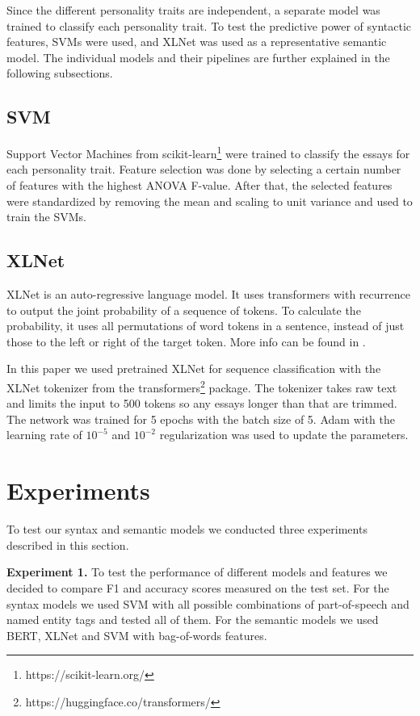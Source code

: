 \documentclass[10pt, a4paper]{article}
\begin{document}
Since the different personality traits are independent, a separate model was trained to classify each personality trait.
To test the predictive power of syntactic features, SVMs were used, and XLNet was used as a representative semantic model.
The individual models and their pipelines are further explained in the following subsections.

\subsection{SVM}

Support Vector Machines from scikit-learn\footnote{https://scikit-learn.org/} were trained to classify the essays for each personality trait.
Feature selection was done by selecting a certain number of features with the highest ANOVA F-value.
After that, the selected features were standardized by removing the mean and scaling to unit variance and used to train the SVMs.

\subsection{XLNet}

XLNet is an auto-regressive language model.
It uses transformers with recurrence to output the joint probability of a sequence of tokens.
To calculate the probability, it uses all permutations of word tokens in a sentence, instead of just those to the left or right of the target token.
More info can be found in \citep{DBLP:journals/corr/abs-1906-08237}.

In this paper we used pretrained XLNet for sequence classification with the XLNet tokenizer from the transformers\footnote{https://huggingface.co/transformers/} package.
The tokenizer takes raw text and limits the input to 500 tokens so any essays longer than that are trimmed.
The network was trained for 5 epochs with the batch size of 5.
Adam with the learning rate of $10^{-5}$ and $10^{-2}$ regularization was used to update the parameters.

\section{Experiments}
To test our syntax and semantic models we conducted three experiments described in this section.

\textbf{Experiment 1.} To test the performance of different models and features we decided to compare F1 and accuracy scores measured on the test set.
For the syntax models we used SVM with all possible combinations of part-of-speech and named entity tags and tested all of them.
For the semantic models we used BERT, XLNet and SVM with bag-of-words features.
\end{document}
